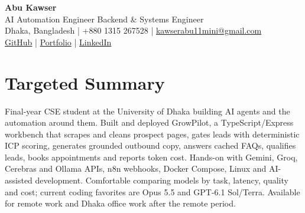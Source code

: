 \documentclass[10pt,a4paper]{article}
\begin{document}
\begin{center}
{\LARGE\bfseries Abu Kawser}\\[2pt]
AI Automation Engineer \textbullet{} Backend \& Systems Engineer\\[2pt]
\small Dhaka, Bangladesh \;|\; +880 1315 267528 \;|\;
\href{mailto:kawserabu11mini@gmail.com}{kawserabu11mini@gmail.com}\\[2pt]
\href{https://github.com/Mayamoho}{GitHub} \;|\;
\href{https://portfolio-sable-nu-70.vercel.app/}{Portfolio} \;|\;
\href{https://www.linkedin.com/in/abu-kawser-40bb49331/}{LinkedIn}
\end{center}

\section{Targeted Summary}
Final-year CSE student at the University of Dhaka building AI agents and the automation around them. Built and deployed GrowPilot, a TypeScript/Express workbench that scrapes and cleans prospect pages, gates leads with deterministic ICP scoring, generates grounded outbound copy, answers cached FAQs, qualifies leads, books appointments and reports token cost. Hands-on with Gemini, Groq, Cerebras and Ollama APIs, n8n webhooks, Docker Compose, Linux and AI-assisted development. Comfortable comparing models by task, latency, quality and cost; current coding favorites are Opus 5.5 and GPT-6.1 Sol/Terra. Available for remote work and Dhaka office work after the remote period.
\end{document}
